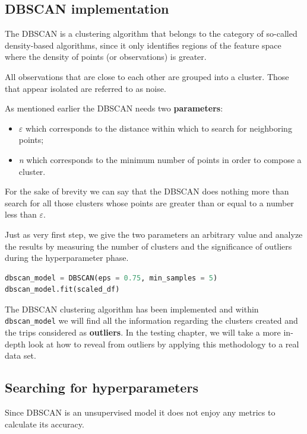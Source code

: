 \subsection{DBSCAN implementation}
The DBSCAN is a clustering algorithm that belongs to the category of so-called density-based algorithms, since it only identifies regions of the feature space where the density of points (or observations) is greater.

All observations that are close to each other are grouped into a cluster. Those that appear isolated are referred to as noise.

As mentioned earlier the DBSCAN needs two \textbf{parameters}:

\begin{itemize}
\item $\varepsilon$ which corresponds to the distance within which to search for neighboring points;
\item \textit{n} which corresponds to the minimum number of points in order to compose a cluster.
\end{itemize}

For the sake of brevity we can say that the DBSCAN does nothing more than search for all those clusters whose points are greater than or equal to a number less than $\varepsilon$.

Just as very first step, we give the two parameters an arbitrary value and analyze the results by measuring the number of clusters and the significance of outliers during the hyperparameter phase.

\begin{lstlisting}[language=Python]
dbscan_model = DBSCAN(eps = 0.75, min_samples = 5)
dbscan_model.fit(scaled_df)
\end{lstlisting}

The DBSCAN clustering algorithm has been implemented and within \verb|dbscan_model| we will find all the information regarding the clusters created and the trips considered as \textbf{outliers}. In the testing chapter, we will take a more in-depth look at how to reveal from outliers by applying this methodology to a real data set.

\subsection{Searching for hyperparameters}
\label{sec:tuning}

Since DBSCAN is an unsupervised model it does not enjoy any metrics to calculate its accuracy.

